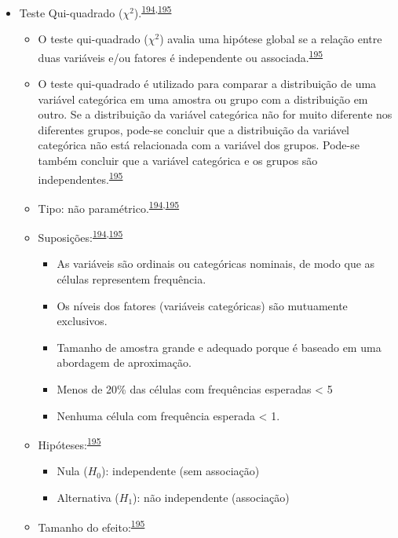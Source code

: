 \documentclass[
  a4paper,
]{book}
\begin{document}
\begin{itemize}
\item
  Teste Qui-quadrado (\(\chi^2\)).\textsuperscript{\protect\hyperlink{ref-McHugh2013}{194},\protect\hyperlink{ref-Kim2017a}{195}}

  \begin{itemize}
  \item
    O teste qui-quadrado (\(\chi^2\)) avalia uma hipótese global se a relação entre duas variáveis e/ou fatores é independente ou associada.\textsuperscript{\protect\hyperlink{ref-Kim2017a}{195}}
  \item
    O teste qui-quadrado é utilizado para comparar a distribuição de uma variável categórica em uma amostra ou grupo com a distribuição em outro. Se a distribuição da variável categórica não for muito diferente nos diferentes grupos, pode-se concluir que a distribuição da variável categórica não está relacionada com a variável dos grupos. Pode-se também concluir que a variável categórica e os grupos são independentes.\textsuperscript{\protect\hyperlink{ref-Kim2017a}{195}}
  \item
    Tipo: não paramétrico.\textsuperscript{\protect\hyperlink{ref-McHugh2013}{194},\protect\hyperlink{ref-Kim2017a}{195}}
  \item
    Suposições:\textsuperscript{\protect\hyperlink{ref-McHugh2013}{194},\protect\hyperlink{ref-Kim2017a}{195}}

    \begin{itemize}
    \item
      As variáveis são ordinais ou categóricas nominais, de modo que as células representem frequência.
    \item
      Os níveis dos fatores (variáveis categóricas) são mutuamente exclusivos.
    \item
      Tamanho de amostra grande e adequado porque é baseado em uma abordagem de aproximação.
    \item
      Menos de 20\% das células com frequências esperadas \textless{} 5
    \item
      Nenhuma célula com frequência esperada \textless{} 1.
    \end{itemize}
  \item
    Hipóteses:\textsuperscript{\protect\hyperlink{ref-Kim2017a}{195}}

    \begin{itemize}
    \item
      Nula (\(H_{0}\)): independente (sem associação)
    \item
      Alternativa (\(H_{1}\)): não independente (associação)
    \end{itemize}
  \item
    Tamanho do efeito:\textsuperscript{\protect\hyperlink{ref-Kim2017a}{195}}


\end{itemize}
\end{itemize}
\end{document}
